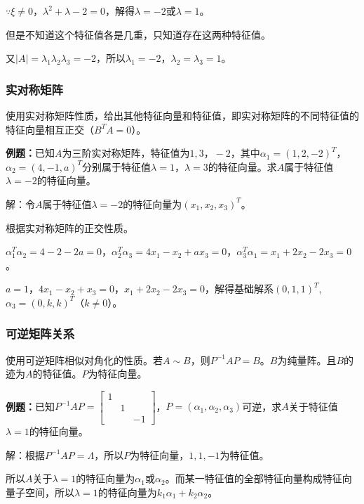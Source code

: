 $\because\xi\neq0$，$\lambda^2+\lambda-2=0$，解得$\lambda=-2$或$\lambda=1$。

但是不知道这个特征值各是几重，只知道存在这两种特征值。

又$\vert A\vert=\lambda_1\lambda_2\lambda_3=-2$，所以$\lambda_1=-2$，$\lambda_2=\lambda_3=1$。

\paragraph{}

\subsubsection{实对称矩阵}

使用实对称矩阵性质，给出其他特征向量和特征值，即实对称矩阵的不同特征值的特征向量相互正交（$B^TA=0$）。

\textbf{例题：}已知$A$为三阶实对称矩阵，特征值为$1,3，-2$，其中$\alpha_1=(1,2,-2)^T$，$\alpha_2=(4,-1,a)^T$分别属于特征值$\lambda=1$，$\lambda=3$的特征向量。求$A$属于特征值$\lambda=-2$的特征向量。

解：令$A$属于特征值$\lambda=-2$的特征向量为$(x_1,x_2,x_3)^T$。

根据实对称矩阵的正交性质。

$\alpha_1^T\alpha_2=4-2-2a=0$，$\alpha_2^T\alpha_3=4x_1-x_2+ax_3=0$，$\alpha_3^T\alpha_1=x_1+2x_2-2x_3=0$。

$a=1$，$4x_1-x_2+x_3=0$，$x_1+2x_2-2x_3=0$，解得基础解系$(0,1,1)^T$,$\alpha_3=(0,k,k)^T$（$k\neq0$）。

\subsubsection{可逆矩阵关系}

使用可逆矩阵相似对角化的性质。若$A\sim B$，则$P^{-1}AP=B$。$B$为纯量阵。且$B$的迹为$A$的特征值。$P$为特征向量。\medskip

\textbf{例题：}已知$P^{-1}AP=\left[\begin{array}{ccc}
    1 \\
     & 1 \\
     & & -1
\end{array}\right]$，$P=(\alpha_1,\alpha_2,\alpha_3)$可逆，求$A$关于特征值$\lambda=1$的特征向量。

解：根据$P^{-1}AP=\Lambda$，所以$P$为特征向量，$1,1,-1$为特征值。

所以$A$关于$\lambda=1$的特征向量为$\alpha_1$或$\alpha_2$。而某一特征值的全部特征向量构成特征向量子空间，所以$\lambda=1$的特征向量为$k_1\alpha_1+k_2\alpha_2$。

